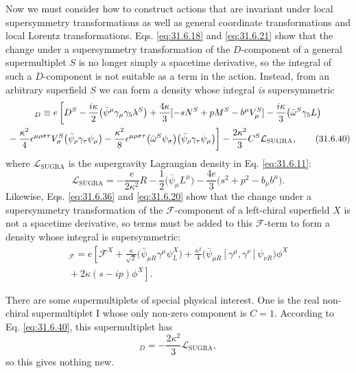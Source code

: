 Now we must consider how to construct actions that are invariant under
local supersymmetry transformations as well as general coordinate
transformations and local Lorentz transformations.
Eqs. \eqref{eq:31.6.18} and \eqref{eq:31.6.21} show that the change
under a supersymmetry transformation of the \(D\)-component of a
general supermultiplet \(S\) is no longer simply a spacetime derivative,
so the integral of such a \(D\)-component is not suitable as a term in
the action. Instead, from an arbitrary superfield \(S\) we can form a
density whose integral \emph{is} supersymmetric
\begin{multline}
  [S]_D\equiv
  e\left[
    D^S-\frac{i\kappa}{2}
      \bigl(\bar\psi^\mu\gamma_\mu\gamma_5\lambda^S\bigr)
    +\frac{4\kappa}{3}
      [-sN^S+pM^S-b^\mu V_\mu^S]
    -\frac{i\kappa}{3}
      \bigl(\bar\omega^S\gamma_5\sl{L}\bigr)\right.\\
  \left.
    {}-\frac{\kappa^2}{4}\epsilon^{\mu\rho\sigma\tau}V_\sigma^S
      \bigl(\bar\psi_\rho\gamma_\tau\psi_\mu\bigr)
    -\frac{\kappa^2}{8}\epsilon^{\mu\rho\sigma\tau}
      \bigl(\bar\omega^S\psi_\sigma\bigr)
      \bigl(\bar\psi_\rho\gamma_\tau\psi_\mu\bigr)
  \right]
  -\frac{2\kappa^2}{3}C^S\mathcal L_{\mathrm{SUGRA}},
  \tag{31.6.40}\label{eq:31.6.40}
\end{multline}
where \(\mathcal L_{\mathrm{SUGRA}}\) is the supergravity Lagrangian
density in Eq. \eqref{eq:31.6.11}:
\begin{equation}
  \mathcal L_{\mathrm{SUGRA}}
  =-\frac{e}{2\kappa^2}R
   -\frac{1}{2}\bigl(\bar\psi_\mu L^\mu\bigr)
   -\frac{4e}{3}\bigl(s^2+p^2-b_\mu b^\mu\bigr).
  \tag{31.6.41}\label{eq:31.6.41}
\end{equation}
Likewise, Eqs. \eqref{eq:31.6.36} and \eqref{eq:31.6.20} show that the
change under a supersymmetry transformation of the
\(\mathcal F\)-component of a left-chiral superfield \(X\) is not a
spacetime derivative, so terms must be added to this
\(\mathcal F\)-term to form a density whose integral is supersymmetric:
\begin{multline}
  [X]_{\mathcal F}
  =e\left[
    \mathcal F^X
    +\frac{\kappa}{\sqrt{2}}
      \bigl(\bar\psi_{\mu R}\gamma^\mu\psi_L^X\bigr)
    +\frac{\kappa^2}{4}
      \bigl(\bar\psi_{\mu R}[\gamma^\mu,\gamma^\nu]\psi_{\nu R}\bigr)
      \phi^X\right.\\
  \left.
    {}+2\kappa(s-ip)\phi^X
  \right].
  \tag{31.6.42}\label{eq:31.6.42}
\end{multline}

There are some supermultiplets of special physical interest. One is the
real non-chiral supermultiplet \(\mathrm I\) whose only non-zero
component is \(C=1\). According to Eq. \eqref{eq:31.6.40}, this
supermultiplet has
\begin{equation}
  [\mathrm I]_D=-\frac{2\kappa^2}{3}\mathcal L_{\mathrm{SUGRA}},
  \tag{31.6.43}\label{eq:31.6.43}
\end{equation}
so this gives nothing new.

